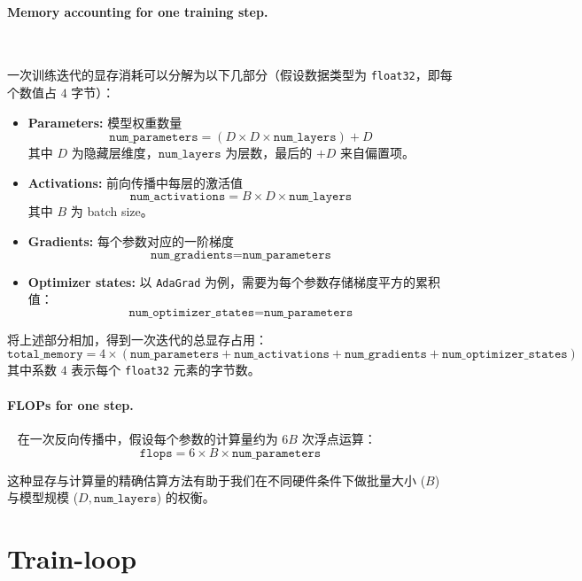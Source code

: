 \paragraph{Memory accounting for one training step.}~{}

一次训练迭代的显存消耗可以分解为以下几部分（假设数据类型为 \texttt{float32}，即每个数值占 $4$ 字节）：

\begin{itemize}
  \item \textbf{Parameters:} 模型权重数量  
    \[
    \texttt{num\_parameters} = (D \times D \times \texttt{num\_layers}) + D
    \]
    其中 $D$ 为隐藏层维度，\(\texttt{num\_layers}\) 为层数，最后的 $+D$ 来自偏置项。

  \item \textbf{Activations:} 前向传播中每层的激活值  
    \[
    \texttt{num\_activations} = B \times D \times \texttt{num\_layers}
    \]
    其中 $B$ 为 batch size。

  \item \textbf{Gradients:} 每个参数对应的一阶梯度  
    \[
    \texttt{num\_gradients} = \texttt{num\_parameters}
    \]

  \item \textbf{Optimizer states:}  
    以 \texttt{AdaGrad} 为例，需要为每个参数存储梯度平方的累积值：
    \[
    \texttt{num\_optimizer\_states} = \texttt{num\_parameters}
    \]
\end{itemize}

将上述部分相加，得到一次迭代的总显存占用：
\[
\texttt{total\_memory} = 4 \times (\texttt{num\_parameters} + \texttt{num\_activations} + \texttt{num\_gradients} + \texttt{num\_optimizer\_states})
\]
其中系数 $4$ 表示每个 \texttt{float32} 元素的字节数。

\paragraph{FLOPs for one step.}~{}
在一次反向传播中，假设每个参数的计算量约为 $6B$ 次浮点运算：
\[
\texttt{flops} = 6 \times B \times \texttt{num\_parameters}
\]

\noindent
这种显存与计算量的精确估算方法有助于我们在不同硬件条件下做批量大小 (\(B\)) 与模型规模 (\(D, \texttt{num\_layers}\)) 的权衡。

\clearpage
\section{Train-loop}

